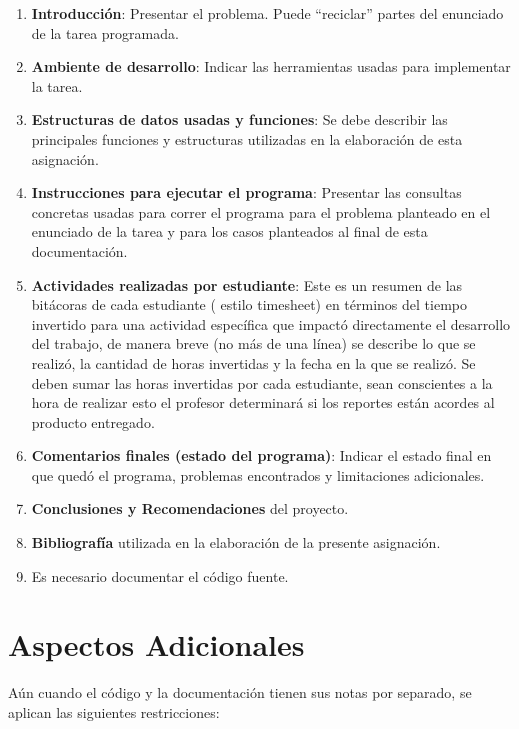 \documentclass{article}
\providecommand{\tightlist}{%
          \setlength{\itemsep}{0pt}\setlength{\parskip}{0pt}}
\begin{document}
\begin{enumerate}
\def\labelenumi{\arabic{enumi}.}
\tightlist
\item
  \textbf{Introducción}: Presentar el problema. Puede ``reciclar''
  partes del enunciado de la tarea programada.
\item
  \textbf{Ambiente de desarrollo}: Indicar las herramientas usadas para
  implementar la tarea.
\item
  \textbf{Estructuras de datos usadas y funciones}: Se debe describir
  las principales funciones y estructuras utilizadas en la elaboración
  de esta asignación.
\item
  \textbf{Instrucciones para ejecutar el programa}: Presentar las
  consultas concretas usadas para correr el programa para el problema
  planteado en el enunciado de la tarea y para los casos planteados al
  final de esta documentación.
\item
  \textbf{Actividades realizadas por estudiante}: Este es un resumen de
  las bitácoras de cada estudiante ( estilo timesheet) en términos del
  tiempo invertido para una actividad específica que impactó
  directamente el desarrollo del trabajo, de manera breve (no más de una
  línea) se describe lo que se realizó, la cantidad de horas invertidas
  y la fecha en la que se realizó. Se deben sumar las horas invertidas
  por cada estudiante, sean conscientes a la hora de realizar esto el
  profesor determinará si los reportes están acordes al producto
  entregado.
\item
  \textbf{Comentarios finales (estado del programa)}: Indicar el estado
  final en que quedó el programa, problemas encontrados y limitaciones
  adicionales.
\item
  \textbf{Conclusiones y Recomendaciones} del proyecto.
\item
  \textbf{Bibliografía} utilizada en la elaboración de la presente
  asignación.
\item
  Es necesario documentar el código fuente.
\end{enumerate}

\section{Aspectos Adicionales}\label{aspectos-adicionales}

Aún cuando el código y la documentación tienen sus notas por separado,
se aplican las siguientes restricciones:
\end{document}
